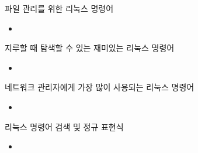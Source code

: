 \documentclass[aspectratio=1610,20pt,xcolor=pdftex,dvipsnames,table,handout]{beamer}
\begin{document}
		\begin{frame} [t,plain]

			\begin{block} {파일 관리를 위한 리눅스 명령어}
			\setlength{\leftmargini}{2em}			
			\begin{itemize}
				\item 
			\end{itemize}
			\end{block}						

		\end{frame}			

		\begin{frame} [t,plain]

			\begin{block} {지루할 때 탐색할 수 있는 재미있는 리눅스 명령어}
			\setlength{\leftmargini}{2em}			
			\begin{itemize}
				\item 
			\end{itemize}
			\end{block}						

		\end{frame}			

		\begin{frame} [t,plain]

			\begin{block} {네트워크 관리자에게 가장 많이 사용되는 리눅스 명령어}
			\setlength{\leftmargini}{2em}			
			\begin{itemize}
				\item 
			\end{itemize}
			\end{block}						

		\end{frame}			

		\begin{frame} [t,plain]

			\begin{block} {리눅스 명령어 검색 및 정규 표현식}
			\setlength{\leftmargini}{2em}			
			\begin{itemize}
				\item 
			\end{itemize}
			\end{block}						

		\end{frame}			
\end{document}
